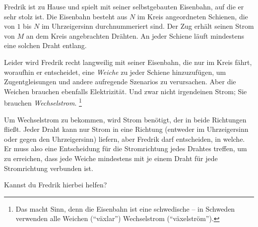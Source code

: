 \ifx\boi\undefined\fi
\def\version{jury-1}

Fredrik ist zu Hause und spielt mit seiner selbstgebauten Eisenbahn, auf die er sehr stolz ist. Die Eisenbahn besteht aus $N$ im Kreis angeordneten Schienen, die von $1$ bis $N$ im Uhrzeigersinn durchnummeriert sind. Der Zug erhält seinen Strom von $M$ an dem Kreis angebrachten Drähten. An jeder Schiene läuft mindestens eine solchen Draht entlang.



Leider wird Fredrik recht langweilig mit seiner Eisenbahn, die nur im Kreis fährt, woraufhin er entscheidet, eine \emph{Weiche} zu jeder Schiene hinzuzufügen, um Zugentgleisungen und andere aufregende Szenarios zu verursachen. Aber die Weichen brauchen ebenfalls Elektrizität. Und zwar nicht irgendeinen Strom; Sie brauchen \emph{Wechselstrom}. \footnote{Das macht Sinn, denn die Eisenbahn ist eine schwedische -- in Schweden verwenden alle Weichen (``växlar'') Wechselstrom (``växelström'').}



Um Wechselstrom zu bekommen, wird Strom benötigt, der in beide Richtungen fließt.
Jeder Draht kann nur Strom in eine Richtung (entweder im Uhrzeigersinn oder gegen den Uhrzeigersinn) liefern, aber Fredrik darf entscheiden, in welche.
Er muss also eine Entscheidung für die Stromrichtung jedes Drahtes treffen, um zu erreichen, dass jede Weiche mindestens mit je einem Draht für jede Stromrichtung verbunden ist.

Kannst du Fredrik hierbei helfen?

